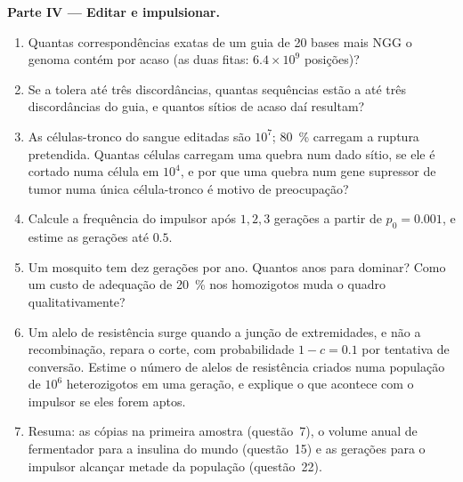 \begin{problem}
\medskip
\noindent\textbf{Parte IV --- Editar e impulsionar.}
\begin{enumerate}[resume]
  \item Quantas correspondências exatas de um guia de 20 bases mais NGG
        o genoma contém por acaso (as duas fitas: $6.4\times 10^{9}$
        posições)?
  \item Se a  tolera até três discordâncias, quantas sequências
        estão a até três discordâncias do guia, e quantos sítios  de acaso daí resultam?
  \item As células-tronco do sangue editadas são $10^{7}$;
        \qty{80}{\%} carregam a ruptura pretendida. Quantas células
        carregam uma quebra  num dado sítio, se ele é
        cortado numa célula em $10^{4}$, e por que uma quebra num gene
        supressor de tumor numa única célula-tronco é motivo de
        preocupação?
  \item Calcule a frequência do impulsor após $1, 2, 3$ gerações a
        partir de $p_{0} = 0.001$, e estime as gerações até $0.5$.
  \item Um mosquito tem dez gerações por ano. Quantos anos para
        dominar? Como um custo de adequação de \qty{20}{\%} nos
        homozigotos muda o quadro qualitativamente?
  \item Um alelo de resistência surge quando a junção de extremidades,
        e não a recombinação, repara o corte, com probabilidade
        $1 - c = 0.1$ por tentativa de conversão. Estime o número de
        alelos de resistência criados numa população de $10^{6}$
        heterozigotos em uma geração, e explique o que acontece com o
        impulsor se eles forem aptos.
  \item Resuma: as cópias na primeira amostra (questão~7), o volume
        anual de fermentador para a insulina do mundo (questão~15) e as
        gerações para o impulsor alcançar metade da população
        (questão~22).
\end{enumerate}
\end{problem}
